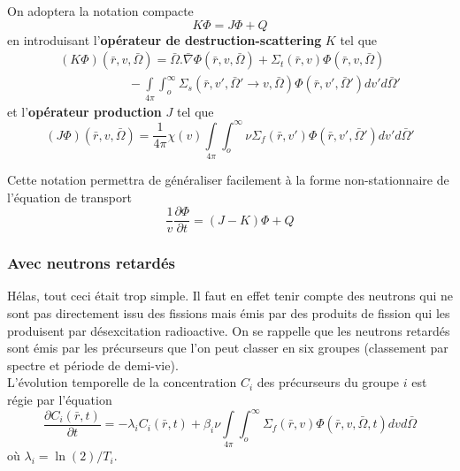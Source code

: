 On adoptera la notation compacte
\begin{equation}
K\varPhi  = J\varPhi  + Q
\end{equation}
en introduisant l'\textbf{opérateur de destruction-scattering} $K$ tel que
\begin{equation}
\begin{array}{l}
(K\varPhi )(\bar r,v,\bar \Omega ) = \bar \Omega .\bar \nabla \varPhi (\bar r,v,\bar \Omega ) + {\Sigma _t}(\bar r,v)\varPhi (\bar r,v,\bar \Omega )\\
\quad \quad \quad \quad \quad \;\; - \int\limits_{4\pi }    \int_o^\infty     {\Sigma _s}(\bar r,v',\bar \Omega ' \to v,\bar \Omega )\varPhi (\bar r,v',\bar \Omega ')dv'd\bar \Omega '
\end{array}
\end{equation}
et l'\textbf{opérateur production} $J$ tel que
\begin{equation}
(J\varPhi )(\bar r,v,\bar \Omega ) = \frac{1}{{4\pi }}\chi (v)\int\limits_{4\pi }    \int_o^\infty     \nu {\Sigma _f}(\bar r,v')\varPhi (\bar r,v',\bar \Omega ')dv'd\bar \Omega '
\end{equation}

Cette notation permettra de généraliser facilement à la forme non-stationnaire de l'équation de transport
\begin{equation}
\frac{1}{v}\frac{{\partial \varPhi }}{{\partial t}} = (J - K)\varPhi  + Q
\end{equation}


\subsubsection{Avec neutrons retardés}
Hélas, tout ceci était trop simple. Il faut en effet tenir compte des neutrons qui ne sont pas 
directement issu des fissions mais émis par des produits de fission qui les produisent par 
désexcitation radioactive. On se rappelle que les neutrons retardés sont émis par les précurseurs 
que l'on peut classer en six groupes (classement par spectre et période de demi-vie).\\

L'évolution temporelle de la concentration $C_i$ des précurseurs du groupe $i$ est régie par l'équation
\begin{equation}
\frac{{\partial {C_i}(\bar r,t)}}{{\partial t}} = - {\lambda _i}{C_i}(\bar r,t)
 + \beta_i \nu \int\limits_{4\pi }    \int_o^\infty     {\Sigma _f}(\bar r,v)\varPhi (\bar r,v,\bar \Omega ,t)dvd\bar \Omega 
\end{equation}
où $\lambda_i = \ln(2)/T_i$.\\

